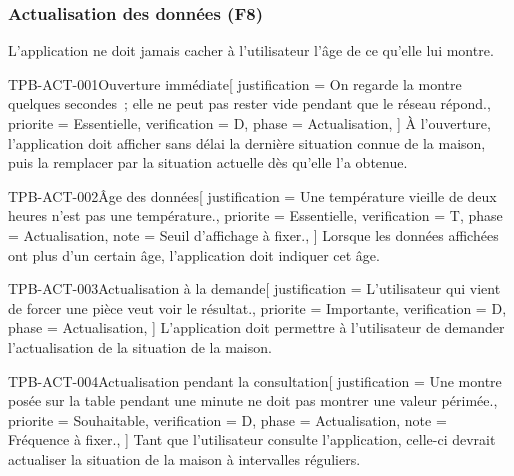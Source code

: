 \subsubsection{Actualisation des données (F8)}
\label{sec:actualisation}

L'application ne doit jamais cacher à l'utilisateur l'âge de ce qu'elle lui montre.

\begin{exigence}{TPB-ACT-001}{Ouverture immédiate}[
    justification = {On regarde la montre quelques secondes~; elle ne peut pas rester vide
                     pendant que le réseau répond.},
    priorite      = {Essentielle},
    verification  = {D},
    phase         = {Actualisation},
  ]
  À l'ouverture, l'application doit afficher sans délai la dernière situation connue de la
  maison, puis la remplacer par la situation actuelle dès qu'elle l'a obtenue.
\end{exigence}

\begin{exigence}{TPB-ACT-002}{Âge des données}[
    justification = {Une température vieille de deux heures n'est pas une température.},
    priorite      = {Essentielle},
    verification  = {T},
    phase         = {Actualisation},
    note          = {Seuil d'affichage à fixer.},
  ]
  Lorsque les données affichées ont plus d'un certain âge, l'application doit indiquer cet
  âge.
\end{exigence}

\begin{exigence}{TPB-ACT-003}{Actualisation à la demande}[
    justification = {L'utilisateur qui vient de forcer une pièce veut voir le résultat.},
    priorite      = {Importante},
    verification  = {D},
    phase         = {Actualisation},
  ]
  L'application doit permettre à l'utilisateur de demander l'actualisation de la situation
  de la maison.
\end{exigence}

\begin{exigence}{TPB-ACT-004}{Actualisation pendant la consultation}[
    justification = {Une montre posée sur la table pendant une minute ne doit pas montrer
                     une valeur périmée.},
    priorite      = {Souhaitable},
    verification  = {D},
    phase         = {Actualisation},
    note          = {Fréquence à fixer.},
  ]
  Tant que l'utilisateur consulte l'application, celle-ci devrait actualiser la situation
  de la maison à intervalles réguliers.
\end{exigence}

